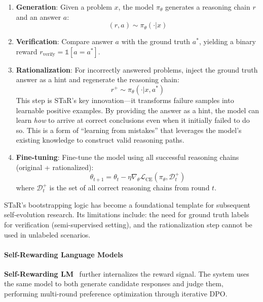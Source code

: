 \begin{enumerate}
\item \textbf{Generation}: Given a problem $x$, the model $\pi_\theta$ generates a reasoning chain $r$ and an answer $a$:
\begin{equation}
(r, a) \sim \pi_\theta(\cdot | x)
\label{eq:star-generate}
\end{equation}

\item \textbf{Verification}: Compare answer $a$ with the ground truth $a^*$, yielding a binary reward $r_{\mathrm{verify}} = \mathbb{1}[a = a^*]$.

\item \textbf{Rationalization}: For incorrectly answered problems, inject the ground truth answer as a hint and regenerate the reasoning chain:
\begin{equation}
r^+ \sim \pi_\theta(\cdot | x, a^*)
\label{eq:star-rationalize}
\end{equation}
This step is STaR's key innovation---it transforms failure samples into learnable positive examples. By providing the answer as a hint, the model can learn \emph{how} to arrive at correct conclusions even when it initially failed to do so. This is a form of ``learning from mistakes'' that leverages the model's existing knowledge to construct valid reasoning paths.

\item \textbf{Fine-tuning}: Fine-tune the model using all successful reasoning chains (original + rationalized):
\begin{equation}
\theta_{t+1} = \theta_t - \eta \nabla_\theta \mathcal{L}_{\mathrm{CE}}(\pi_\theta, \mathcal{D}_t^+)
\label{eq:star-train}
\end{equation}
where $\mathcal{D}_t^+$ is the set of all correct reasoning chains from round $t$.
\end{enumerate}

STaR's bootstrapping logic has become a foundational template for subsequent self-evolution research. Its limitations include: the need for ground truth labels for verification (semi-supervised setting), and the rationalization step cannot be used in unlabeled scenarios.

\paragraph{Self-Rewarding Language Models}

\textbf{Self-Rewarding LM}~\citep{selfrewarding2024} further internalizes the reward signal. The system uses the same model to both generate candidate responses and judge them, performing multi-round preference optimization through iterative DPO.

